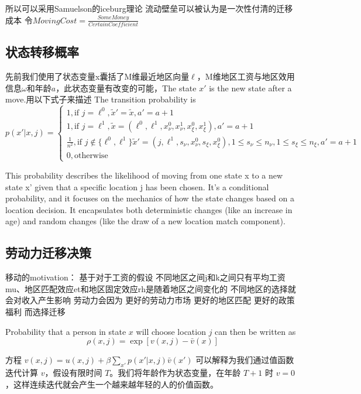 \documentclass[10pt,a4paper]{article}
\begin{document}
所以可以采用Samuelson的iceburg理论 流动壁垒可以被认为是一次性付清的迁移成本
令$MovingCost = \frac{SomeMoney}{CertainCoefficient}$


\subsection{状态转移概率}
先前我们使用了状态变量x囊括了M维最近地区向量$\ell$，M维地区工资与地区效用信息$\omega$和年龄$a$，此状态变量有改变的可能，The state $x'$ is the new state after a move.用以下式子来描述
The transition probability is 
\begin{equation}
  p(x'|x,j)=
  \begin{cases}
    1, \text{if }j=\ell^0,\tilde x'=\tilde x,a'=a+1
    \\
    1, \text{if }j=\ell^1,\tilde x =(\ell^0,\ell^1,x_\nu^0,x_\nu^1,x_\xi^0,x_\xi^1),a'=a+1
    \\
    \frac{1}{n^2}, \text{if }j \notin \{\ell^0,\ell^1\}\tilde x'=(j,\ell^1,s_\nu,x_\nu^0,s_\xi,x_\xi^0),1\leqslant s_\nu \leqslant n_\nu,1\leqslant s_\xi \leqslant n_\xi,a'=a+1
    \\
    0, \text{otherwise}
  \end{cases}
\end{equation}

This probability describes the likelihood of moving from one state x to a new state x' given that a specific location j has been chosen. It's a conditional probability, and it focuses on the mechanics of how the state changes based on a location decision. It encapsulates both deterministic changes (like an increase in age) and random changes (like the draw of a new location match component).


\subsection{劳动力迁移决策}
移动的motivation：
基于对于工资的假设
不同地区之间j和k之间只有平均工资mu、地区匹配效应et和地区固定效应rh是随着地区之间变化的
不同地区的选择就会对收入产生影响
劳动力会因为
更好的劳动力市场
更好的地区匹配
更好的政策福利
而选择迁移


Probability that a person in state $x$ will choose location $j$ can then be written as
$$\rho(x,j)=\exp[v(x,j)-\bar v(x)]$$

方程 $v(x, j) = u(x, j) + \beta \sum_{x'} p(x' | x, j) \bar{v}(x')$ 可以解释为我们通过值函数迭代计算 $v$，假设有限时间 $T$。我们将年龄作为状态变量，在年龄 $T+1$ 时 $v=0$，这样连续迭代就会产生一个越来越年轻的人的价值函数。
\end{document}
